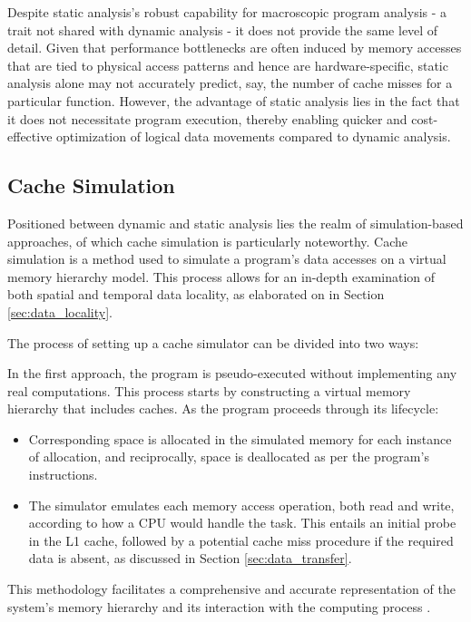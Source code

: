 Despite static analysis's robust capability for macroscopic program analysis - a trait not shared with dynamic analysis - it does not provide the same level of detail. Given that performance bottlenecks are often induced by memory accesses that are tied to physical access patterns and hence are hardware-specific, static analysis alone may not accurately predict, say, the number of cache misses for a particular function. However, the advantage of static analysis lies in the fact that it does not necessitate program execution, thereby enabling quicker and cost-effective optimization of logical data movements compared to dynamic analysis.

\subsection{Cache Simulation}\label{sec:simulation}

Positioned between dynamic and static analysis lies the realm of simulation-based approaches, of which cache simulation is particularly noteworthy. Cache simulation is a method used to simulate a program's data accesses on a virtual memory hierarchy model. This process allows for an in-depth examination of both spatial and temporal data locality, as elaborated on in Section \ref{sec:data_locality}.

The process of setting up a cache simulator can be divided into two ways:

In the first approach, the program is pseudo-executed without implementing any real computations. This process starts by constructing a virtual memory hierarchy that includes caches. As the program proceeds through its lifecycle:
\begin{itemize}
	\item Corresponding space is allocated in the simulated memory for each instance of allocation, and reciprocally, space is deallocated as per the program's instructions.
	\item The simulator emulates each memory access operation, both read and write, according to how a CPU would handle the task. This entails an initial probe in the L1 cache, followed by a potential cache miss procedure if the required data is absent, as discussed in Section \ref{sec:data_transfer}.
\end{itemize}
This methodology facilitates a comprehensive and accurate representation of the system's memory hierarchy and its interaction with the computing process \cite{schaad2022boosting,hammer2017kerncraft}.

